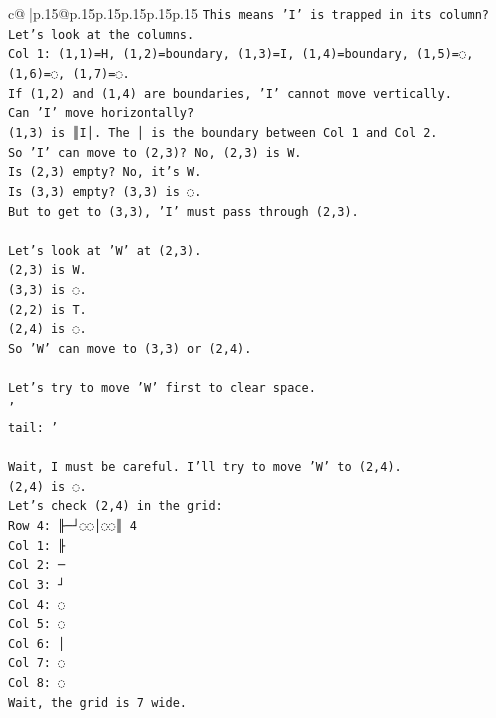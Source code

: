 \documentclass{article}
\begin{document}
{\begin{supertabular}{c@{$\;$}|p{.15\linewidth}@{}p{.15\linewidth}p{.15\linewidth}p{.15\linewidth}p{.15\linewidth}p{.15\linewidth}}
{{{\texttt{This means 'I' is trapped in its column?} \\
\texttt{Let's look at the columns.} \\
\texttt{Col 1: (1,1)=H, (1,2)=boundary, (1,3)=I, (1,4)=boundary, (1,5)=◌, (1,6)=◌, (1,7)=◌.} \\
\texttt{If (1,2) and (1,4) are boundaries, 'I' cannot move vertically.} \\
\texttt{Can 'I' move horizontally?} \\
\texttt{(1,3) is ║I│. The │ is the boundary between Col 1 and Col 2.} \\
\texttt{So 'I' can move to (2,3)? No, (2,3) is W.} \\
\texttt{Is (2,3) empty? No, it's W.} \\
\texttt{Is (3,3) empty? (3,3) is ◌.} \\
\texttt{But to get to (3,3), 'I' must pass through (2,3).} \\
\\ 
\texttt{Let's look at 'W' at (2,3).} \\
\texttt{(2,3) is W.} \\
\texttt{(3,3) is ◌.} \\
\texttt{(2,2) is T.} \\
\texttt{(2,4) is ◌.} \\
\texttt{So 'W' can move to (3,3) or (2,4).} \\
\\ 
\texttt{Let's try to move 'W' first to clear space.} \\
\texttt{'} \\
\texttt{tail: '} \\
\\ 
\texttt{Wait, I must be careful. I'll try to move 'W' to (2,4).} \\
\texttt{(2,4) is ◌.} \\
\texttt{Let's check (2,4) in the grid:} \\
\texttt{Row 4: ╟─┘◌◌│◌◌║ 4} \\
\texttt{Col 1: ╟} \\
\texttt{Col 2: ─} \\
\texttt{Col 3: ┘} \\
\texttt{Col 4: ◌} \\
\texttt{Col 5: ◌} \\
\texttt{Col 6: │} \\
\texttt{Col 7: ◌} \\
\texttt{Col 8: ◌} \\
\texttt{Wait, the grid is 7 wide.} \\
}}}
\end{supertabular}}
\end{document}
